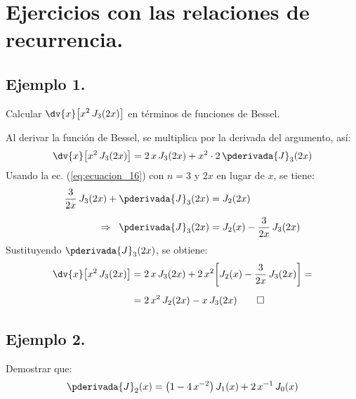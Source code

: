 \newpage
\section{Ejercicios con las relaciones de recurrencia.}

\subsection{Ejemplo 1.}

\noindent
Calcular $\displaystyle \dv{x} \big[ x^{2} \, J_{3}(2 x) \big]$ en términos de funciones de Bessel.
\par
Al derivar la función de Bessel, se multiplica por la derivada del argumento, así:
\begin{align*}
\dv{x} \big[ x^{2} \, J_{3}(2 x) \big] = 2 \, x \, J_{3} (2 x) + x^{2} \cdot 2 \, \pderivada{J}_{3} (2 x)
\end{align*}
Usando la ec. (\ref{eq:ecuacion_16}) con $n = 3$ y $2 x$ en lugar de $x$, se tiene:
\begin{align*}
\dfrac{3}{2 x} \, J_{3}(2 x) + \pderivada{J}_{3}(2 x) &= J_{2} (2 x) \\[0.5em]
\Rightarrow \hspace{0.2cm} \pderivada{J}_{3} (2 x) &= J_{2}(x) - \dfrac{3}{2 x} \, J_{3} (2 x)
\end{align*}
Sustituyendo $\pderivada{J}_{3}(2 x)$, se obtiene:
\begin{align*}
\dv{x} \big[ x^{2} \, J_{3}(2 x) \big] &=  2 \, x \, J_{3} (2 x) + 2 \, x^{2} \bigg[ J_{2}(x) - \dfrac{3}{2 x} \, J_{3} (2 x) \bigg] = \\[0.5em]
&= 2 \, x^{2} \, J_{2} (2 x) - x \, J_{3} (2 x) \qed
\end{align*}

\subsection{Ejemplo 2.}

\noindent

Demostrar que:
\begin{align*}
\pderivada{J}_{2}(x) = \big( 1 - 4 \, x^{-2} \big) \, J_{1}(x) + 2 \, x^{-1} \, J_{0} (x)
\end{align*}

